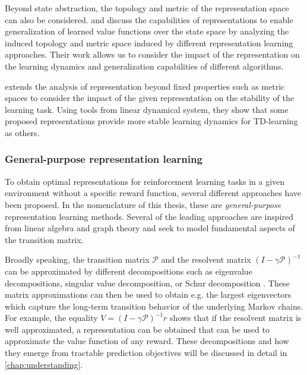 Beyond state abstraction, the topology and metric of the representation space can also be considered. 
\textcite{le2021metrics} and \textcite{lelan2022generalization} discuss the capabilities of representations to enable generalization of learned value functions over the state space by analyzing the induced topology and metric space induced by different representation learning approaches.
Their work allows us to consider the impact of the representation on the learning dynamics and generalization capabilities of different algorithms.

\textcite{ghosh2020representations} extends the analysis of representation beyond fixed properties such as metric spaces to consider the impact of the given representation on the stability of the learning task.
Using tools from linear dynamical system, they show that some proposed representations provide more stable learning dynamics for TD-learning as others.

\subsubsection{General-purpose representation learning}

To obtain optimal representations for reinforcement learning tasks in a given environment without a specific reward function, several different approaches have been proposed.
In the nomenclature of this thesis, these are \emph{general-purpose} representation learning methods.
Several of the leading approaches are inspired from linear algebra and graph theory and seek to model fundamental aspects of the transition matrix.

Broadly speaking, the transition matrix $\mathcal{P}$ and the resolvent matrix $(I - \gamma \mathcal{P})^{-1}$ can be approximated by different decompositions such as eigenvalue decompositions, singular value decomposition, or Schur decomposition \parencite{mahadevan2005proto,mahadevan2007proto,ghosh2020representations}.
These matrix approximations can then be used to obtain e.g. the largest eigenvectors which capture the long-term transition behavior of the underlying Markov chains.
For example, the equality $V = (I - \gamma \mathcal{P})^{-1} r$ shows that if the resolvent matrix is well approximated, a representation can be obtained that can be used to approximate the value function of any reward.
These decompositions and how they emerge from tractable prediction objectives will be discussed in detail in \autoref{chap:understanding}.

